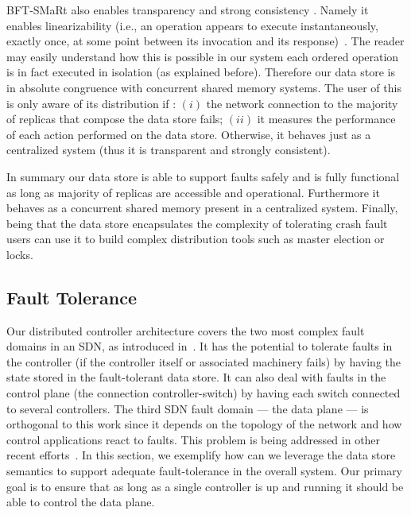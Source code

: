 BFT-SMaRt also enables transparency and strong consistency . Namely it enables linearizability (i.e., an operation appears to execute instantaneously, exactly once, at some point between its invocation and its response)~\cite{herlihy1990linearizability}. The reader may easily understand how this is possible in our system each ordered operation is in fact executed in isolation (as explained before). Therefore our data store is in absolute congruence with concurrent shared memory systems.  The user of this is only aware of its distribution if : $(i)$ the network connection to the majority of replicas that compose the data store fails; $(ii)$  it measures the performance of each action performed on the data store. Otherwise, it behaves just as a centralized system (thus it is transparent and strongly consistent). 


In summary our data store is able to support faults safely and is fully functional as long as majority of replicas are accessible and operational.  Furthermore it behaves as a concurrent shared memory present in a centralized system. Finally, being that  the data store  encapsulates the complexity of tolerating crash fault users can use it to build complex distribution tools such as master election or locks.  


\subsection{Fault Tolerance}
\label{sec:heimdall:fault-tolerance}
Our distributed controller architecture covers the two most complex fault domains in an SDN, as introduced in~\cite{kim2012}.
It has the potential to tolerate faults in the controller (if the controller itself or associated machinery fails) by having the state stored in the fault-tolerant data store.
It can also deal with faults in the control plane (the connection controller-switch) by having each switch connected to several controllers. 
The third SDN fault domain --- the data plane --- is orthogonal to this work since it depends on the topology of the network and how control applications react to faults.
This problem is being addressed in other recent efforts~\cite{kim2012,Reitblatt2013}. 
In this section, we exemplify how can we leverage the data store semantics to support adequate fault-tolerance in the overall system. 
Our primary goal is to ensure that as long as a single controller is up and running it should be able to control the data plane. 

